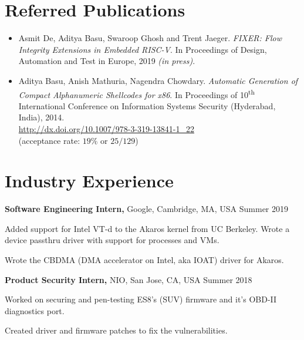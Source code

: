 \documentclass[margin]{res}
\begin{document}
\begin{resume}
\section{Referred Publications}
\begin{itemize}
\item
    Asmit De, Aditya Basu, Swaroop Ghosh and Trent Jaeger.
    \emph{FIXER: Flow Integrity Extensions in Embedded RISC-V}.
    In Proceedings of Design, Automation and Test in Europe, 2019 \emph{(in press)}.

\item
    Aditya Basu, Anish Mathuria, Nagendra Chowdary.
    \emph{Automatic Generation of Compact Alphanumeric Shellcodes for x86}.
    In Proceedings of 10\textsuperscript{th} International Conference on Information Systems Security (Hyderabad, India), 2014.\\
    \url{http://dx.doi.org/10.1007/978-3-319-13841-1_22}\\
    (acceptance rate: $19\%$ or $25/129$)\\
\end{itemize}

\section{Industry Experience}

{\bf Software Engineering Intern,} Google, Cambridge, MA, USA
\hfill Summer  2019 %
\begin{itemizeexp}
    \item Added support for Intel VT-d to the Akaros kernel from UC Berkeley.
    Wrote a device passthru driver with support for processes and VMs.
    \item Wrote the CBDMA (DMA accelerator on Intel, aka IOAT) driver for
    Akaros.
\end{itemizeexp}

{\bf Product Security Intern,} NIO, San Jose, CA, USA
\hfill Summer 2018 %
\begin{itemizeexp}
    \item Worked on securing and pen-testing ES8's (SUV) firmware and it's OBD-II diagnostics port.
    \item Created driver and firmware patches to fix the vulnerabilities.
\end{itemizeexp}


\end{resume}
\end{document}
